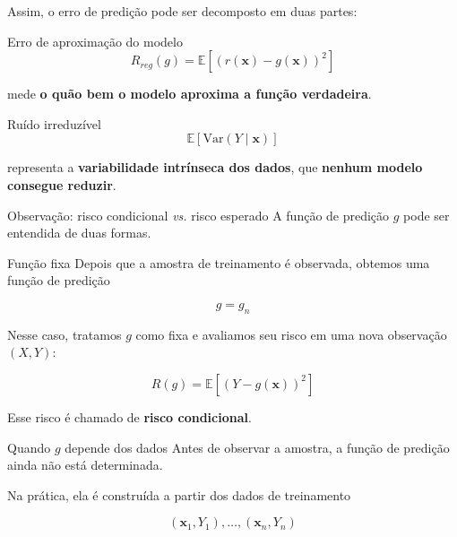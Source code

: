 \documentclass[
  ignorenonframetext,
  aspectratio=169,
]{beamer}
\begin{document}
\begin{frame}
Assim, o erro de predição pode ser decomposto em duas partes:

\begin{block}{Erro de aproximação do modelo}
\label{erro-de-aproximauxe7uxe3o-do-modelo}
\[
R_{reg}(g) = \mathbb{E}[(r(\mathbf{x}) - g(\mathbf{x}))^2]
\]

mede \textbf{o quão bem o modelo aproxima a função verdadeira}.
\end{block}

\begin{block}{Ruído irreduzível}
\label{ruuxeddo-irreduzuxedvel}
\[
\mathbb{E}[\mathrm{Var}(Y \mid \mathbf{x})]
\]

representa a \textbf{variabilidade intrínseca dos dados}, que
\textbf{nenhum modelo consegue reduzir}.
\end{block}
\end{frame}

\begin{frame}{Observação: risco condicional \emph{vs.} risco esperado}
\label{observauxe7uxe3o-risco-condicional-vs.-risco-esperado}
A função de predição \(g\) pode ser entendida de duas formas.

\begin{block}{Função fixa}
\label{funuxe7uxe3o-fixa}
Depois que a amostra de treinamento é observada, obtemos uma função de
predição

\[
g = g_n
\]
\end{block}
\end{frame}

\begin{frame}
Nesse caso, tratamos \(g\) como fixa e avaliamos seu risco em uma nova
observação \((X,Y)\):

\[
R(g) = \mathbb{E}\left[(Y-g(\mathbf{x}))^2\right]
\]

Esse risco é chamado de \textbf{risco condicional}.

\begin{block}{Quando \(g\) depende dos dados}
\label{quando-g-depende-dos-dados}
Antes de observar a amostra, a função de predição ainda não está
determinada.

Na prática, ela é construída a partir dos dados de treinamento

\[
(\mathbf{x}_1,Y_1),\ldots,(\mathbf{x}_n,Y_n)
\]
\end{block}
\end{frame}
\end{document}
